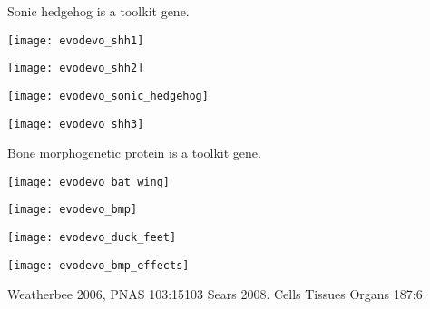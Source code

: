 \documentclass[t,handout]{beamer}  %
\begin{document}

\begin{frame}{Sonic hedgehog  is a toolkit gene.}

\vspace*{-\baselineskip}

\begin{multicols}{2}

\centering

\texttt{[image: evodevo\_shh1]}

\vspace{0.5ex}

\texttt{[image: evodevo\_shh2]}

\columnbreak

\vspace*{-\baselineskip}

\texttt{[image: evodevo\_sonic\_hedgehog]}

\vspace{0.5ex}

\texttt{[image: evodevo\_shh3]}


\end{multicols}

\end{frame}


\begin{frame}{Bone morphogenetic protein  is a toolkit gene.}

\vspace*{-\baselineskip}

\begin{multicols}{2}

\centering

\texttt{[image: evodevo\_bat\_wing]}

\vspace{0.5ex}

\texttt{[image: evodevo\_bmp]}

\vspace{0.5ex}

\texttt{[image: evodevo\_duck\_feet]}

\columnbreak

\texttt{[image: evodevo\_bmp\_effects]}

\end{multicols}

\vfilll
\tiny Weatherbee 2006, PNAS 103:15103 
\hfill
Sears 2008. Cells Tissues Organs 187:6


\end{frame}
\end{document}
